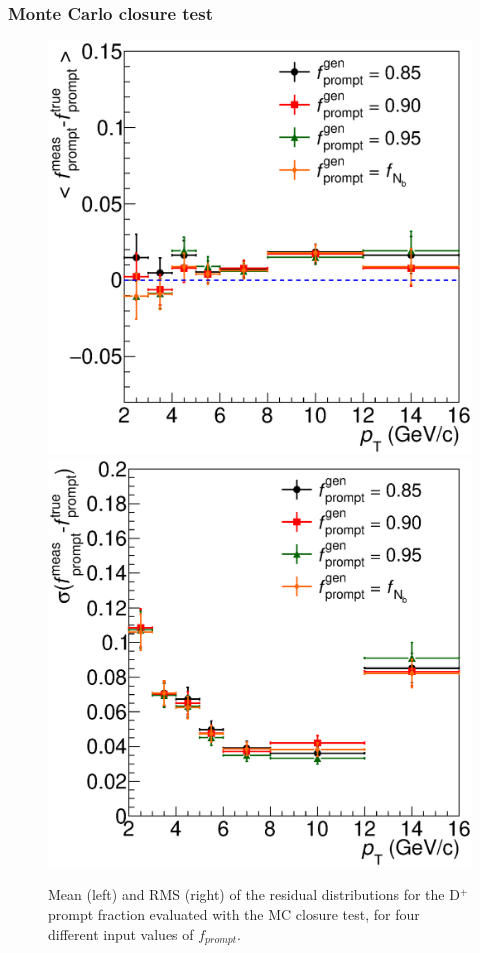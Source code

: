 \documentclass[b5paper,10pt,twoside,oldstyle,classica]{toptesi}
\begin{document}
\subsubsection{Monte Carlo closure test}
\begin{figure}[b]
\begin{center}
{\includegraphics[scale = 0.32]{Bias_bkg_freesigma.eps}}
\hspace{-0.6cm}
{\includegraphics[scale = 0.32]{BiasRMS_bkg_freesigma.eps}}
\caption{Mean (left) and RMS (right) of the residual distributions for the D$^+$ prompt fraction evaluated with the MC closure test, for four different input values of $f_{prompt}$.}
\label{MCclosuretest_frac}
\end{center}
\end{figure} 
\end{document}
